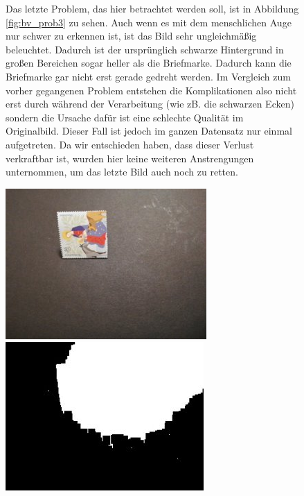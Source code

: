 \documentclass[12pt,toc=bib,toc=listof]{scrreprt}
\begin{document}
\begin{figure}[h]
\begin{minipage}[t]{.75\linewidth}

Das letzte Problem, das hier betrachtet werden soll, ist in Abbildung \ref{fig:bv_prob3} zu sehen. Auch wenn es mit dem menschlichen Auge nur schwer zu erkennen ist, ist das Bild sehr ungleichmäßig beleuchtet. Dadurch ist der ursprünglich schwarze Hintergrund in großen Bereichen sogar heller als die Briefmarke. Dadurch kann die Briefmarke gar nicht erst gerade gedreht werden. Im Vergleich zum vorher gegangenen Problem entstehen die Komplikationen also nicht erst durch während der Verarbeitung (wie zB. die schwarzen Ecken) sondern die Ursache dafür ist eine schlechte Qualität im Originalbild. Dieser Fall ist jedoch im ganzen Datensatz nur einmal aufgetreten.  Da wir entschieden haben, dass dieser Verlust verkraftbar ist, wurden hier keine weiteren Anstrengungen unternommen, um das letzte Bild auch noch zu retten.
\end{minipage}
\hfill
\begin{minipage}[t]{.2\linewidth}
  \strut\vspace*{-\baselineskip}\newline\includegraphics[width=\linewidth]{./../bilder/prob3_pic}
  \includegraphics[width=\linewidth]{./../bilder/prob3_bad_bin}

\end{minipage}
\end{figure}
\end{document}
